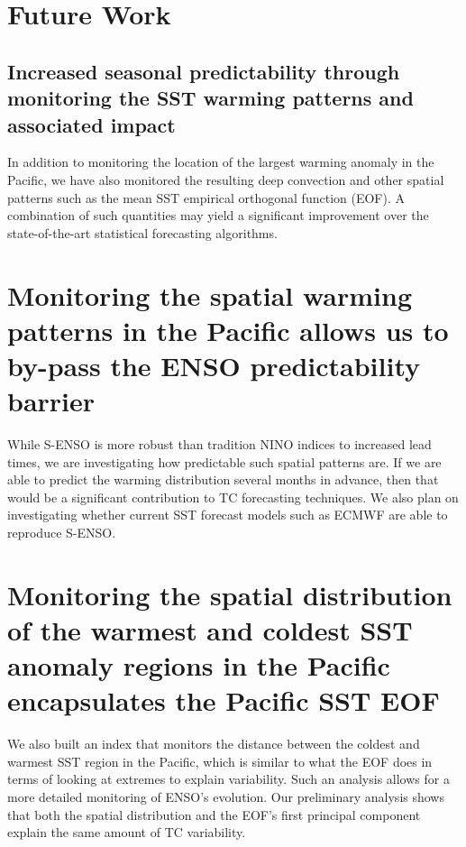\section{Future Work}
\subsection{Increased seasonal predictability through monitoring the SST warming patterns and associated impact}
In addition to monitoring the location of the largest warming anomaly in the Pacific, we have also monitored the resulting deep convection and other spatial patterns such as the mean SST empirical orthogonal function (EOF). A combination of such quantities may yield a significant improvement over the state-of-the-art statistical forecasting algorithms.

\section{Monitoring the spatial warming patterns in the Pacific allows us to by-pass the ENSO predictability barrier}
While S-ENSO is more robust than tradition NINO indices to increased lead times, we are investigating how predictable such spatial patterns are. If we are able to predict the warming distribution several months in advance, then that would be a significant contribution to TC forecasting techniques. We also plan on investigating whether current SST forecast models such as ECMWF are able to reproduce S-ENSO.

\section{Monitoring the spatial distribution of the warmest and coldest SST anomaly regions in the Pacific encapsulates the Pacific SST EOF}
We also built an index that monitors the distance between the coldest and warmest SST region in the Pacific, which is similar to what the EOF does in terms of looking at extremes to explain variability. Such an analysis allows for a more detailed monitoring of ENSO's evolution. Our preliminary analysis shows that both the spatial distribution and the EOF's first principal component explain the same amount of TC variability.